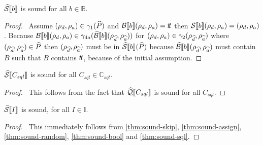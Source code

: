 \begin{lemma}\label{thm:sound-bool}
    $\widehat{\mathcal{S}} \llbracket b \rrbracket$ is sound for all $b \in \mathbb{B}$.
\end{lemma}

\begin{proof}
    \pf\
    Assume $(\rho_{d}, \rho_{a}) \in \gamma_1(\widehat{P})$ and $\mathcal{B}\llbracket b \rrbracket(\rho_{d}, \rho_{a}) = t\!t$ then $\mathcal{S} \llbracket b \rrbracket(\rho_{d}, \rho_{a}) = (\rho_{d}, \rho_{a})$.
    Because $\mathcal{B}\llbracket b \rrbracket(\rho_{d}, \rho_{a}) \in \gamma_{4a}(\widehat{\mathcal{B}}\llbracket b \rrbracket(\rho_{\widehat{d}}, \rho_{\widehat{a}}))$ for $(\rho_{d}, \rho_{a}) \in \gamma_2(\rho_{\widehat{d}}, \rho_{\widehat{a}})$ where $(\rho_{\widehat{d}}, \rho_{\widehat{a}}) \in \widehat{P}$ then $(\rho_{\widehat{d}}, \rho_{\widehat{a}})$ must be in $\widehat{\mathcal{S}} \llbracket b \rrbracket(\widehat{P})$ because $\widehat{\mathcal{B}}\llbracket b \rrbracket(\rho_{\widehat{d}}, \rho_{\widehat{a}})$ must contain $B$ such that $B$ contains $t\!t$, because of the initial assumption.
\end{proof}

\begin{lemma}\label{thm:sound-sql}
    $\widehat{\mathcal{S}} \llbracket C_{sql} \rrbracket$ is sound for all $C_{sql} \in \mathbb{C}_{sql}$.
\end{lemma}

\begin{proof}
    \pf\
    This follows from the fact that $\widehat{\mathcal{Q}}\llbracket C_{sql} \rrbracket$ is sound for all $C_{sql}$.
\end{proof}

\begin{theorem}
    $\widehat{\mathcal{S}} \llbracket I \rrbracket$ is sound, for all $I \in \mathbb{I}$.
\end{theorem}

\begin{proof}
    \pf\
    This immediately follows from \autoref{thm:sound-skip}, \ref{thm:sound-assign}, \ref{thm:sound-random}, \ref{thm:sound-bool} and \ref{thm:sound-sql}.
\end{proof}

